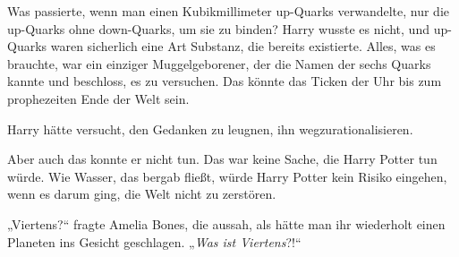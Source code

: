 Was passierte, wenn man einen Kubikmillimeter up-Quarks verwandelte, nur die up-Quarks ohne down-Quarks, um sie zu binden? Harry wusste es nicht, und up-Quarks waren sicherlich eine Art Substanz, die bereits existierte. Alles, was es brauchte, war ein einziger Muggelgeborener, der die Namen der sechs Quarks kannte und beschloss, es zu versuchen. Das könnte das Ticken der Uhr bis zum prophezeiten Ende der Welt sein.

Harry hätte versucht, den Gedanken zu leugnen, ihn wegzurationalisieren.

Aber auch das konnte er nicht tun. Das war keine Sache, die Harry Potter tun würde.
Wie Wasser, das bergab fließt, würde Harry Potter kein Risiko eingehen, wenn es darum ging, die Welt nicht zu zerstören.

„Viertens?“ fragte Amelia Bones, die aussah, als hätte man ihr wiederholt einen Planeten ins Gesicht geschlagen.
„\emph{Was ist Viertens}?!“

